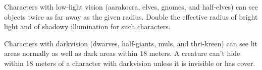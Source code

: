 Characters with low-light vision (aarakocra, elves, gnomes, and half-elves) can see objects twice as far away as the given radius. Double the effective radius of bright light and of shadowy illumination for such characters.

Characters with darkvision (dwarves, half-giants, muls, and thri-kreen) can see lit areas normally as well as dark areas within 18 meters. A creature can't hide within 18 meters of a character with darkvision unless it is invisible or has cover.
